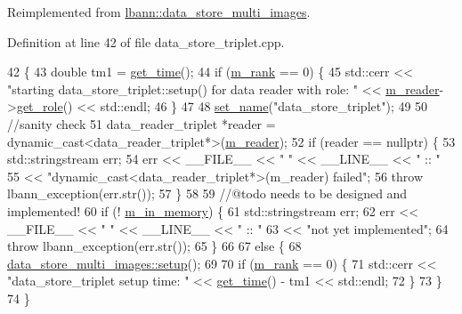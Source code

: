 Reimplemented from \hyperlink{classlbann_1_1data__store__multi__images_a7b5e9ec7b7132872299a204d5d24ee62}{lbann\+::data\+\_\+store\+\_\+multi\+\_\+images}.



Definition at line 42 of file data\+\_\+store\+\_\+triplet.\+cpp.


\begin{DoxyCode}
42                                \{
43   \textcolor{keywordtype}{double} tm1 = \hyperlink{namespacelbann_a478d36031ff0659893c4322cd856157f}{get\_time}();
44   \textcolor{keywordflow}{if} (\hyperlink{classlbann_1_1generic__data__store_a87695bfd2d1ed0dbe01d99108e3f68b7}{m\_rank} == 0) \{
45     std::cerr << \textcolor{stringliteral}{"starting data\_store\_triplet::setup() for data reader with role: "} << 
      \hyperlink{classlbann_1_1generic__data__store_afa49ced0ab64c632371ea52532a91ec2}{m\_reader}->\hyperlink{classlbann_1_1generic__data__reader_a92982e1b399f37e2ead5aa440883cba5}{get\_role}() << std::endl;
46   \}
47 
48   \hyperlink{classlbann_1_1generic__data__store_a853741295a07b5687921fc56d0d7d5b2}{set\_name}(\textcolor{stringliteral}{"data\_store\_triplet"});
49 
50   \textcolor{comment}{//sanity check}
51   data\_reader\_triplet *reader = \textcolor{keyword}{dynamic\_cast<}data\_reader\_triplet*\textcolor{keyword}{>}(\hyperlink{classlbann_1_1generic__data__store_afa49ced0ab64c632371ea52532a91ec2}{m\_reader});
52   \textcolor{keywordflow}{if} (reader == \textcolor{keyword}{nullptr}) \{
53     std::stringstream err;
54     err << \_\_FILE\_\_ << \textcolor{stringliteral}{" "} << \_\_LINE\_\_ << \textcolor{stringliteral}{" :: "}
55         << \textcolor{stringliteral}{"dynamic\_cast<data\_reader\_triplet*>(m\_reader) failed"};
56     \textcolor{keywordflow}{throw} lbann\_exception(err.str());
57   \}
58 
59   \textcolor{comment}{//@todo needs to be designed and implemented!}
60   \textcolor{keywordflow}{if} (! \hyperlink{classlbann_1_1generic__data__store_a1a9cc7b097cd7dd6ae0d12d52bb43ea1}{m\_in\_memory}) \{
61     std::stringstream err;
62     err << \_\_FILE\_\_ << \textcolor{stringliteral}{" "} << \_\_LINE\_\_ << \textcolor{stringliteral}{" :: "}
63         << \textcolor{stringliteral}{"not yet implemented"};
64     \textcolor{keywordflow}{throw} lbann\_exception(err.str());
65   \} 
66   
67   \textcolor{keywordflow}{else} \{
68     \hyperlink{classlbann_1_1data__store__multi__images_a7b5e9ec7b7132872299a204d5d24ee62}{data\_store\_multi\_images::setup}();
69 
70     \textcolor{keywordflow}{if} (\hyperlink{classlbann_1_1generic__data__store_a87695bfd2d1ed0dbe01d99108e3f68b7}{m\_rank} == 0) \{
71       std::cerr << \textcolor{stringliteral}{"data\_store\_triplet setup time: "} << \hyperlink{namespacelbann_a478d36031ff0659893c4322cd856157f}{get\_time}() - tm1 << std::endl;
72     \}
73   \}
74 \}
\end{DoxyCode}
